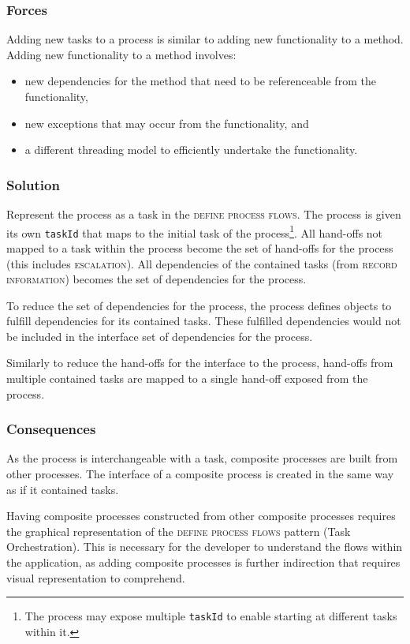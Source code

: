 \documentclass[prodmode]{style/acmlarge}
\begin{document}
\subsubsection*{Forces} Adding new tasks to a process is similar to adding new
functionality to a method.  Adding new functionality to a method involves:
\begin{itemize}
  \item new dependencies for the method that need to be referenceable from the functionality,
  \item new exceptions that may occur from the functionality, and
  \item a different threading model to efficiently undertake the functionality. 
\end{itemize}

\subsubsection*{Solution} Represent the process as a task in the \textsc{define
process flows}.  The process is given its own \texttt{taskId} that maps to the
initial task of the process\footnote{The process may expose multiple
\texttt{taskId} to enable starting at different tasks within it.}.  All
hand-offs not mapped to a task within the process become the set of hand-offs
for the process (this includes \textsc{escalation}).  All dependencies of the
contained tasks (from \textsc{record information}) becomes the set of
dependencies for the process.

To reduce the set of dependencies for the process, the process defines objects
to fulfill dependencies for its contained tasks.  These fulfilled dependencies
would not be included in the interface set of dependencies for the process.

Similarly to reduce the hand-offs for the interface to the process, hand-offs
from multiple contained tasks are mapped to a single hand-off exposed from the
process.

\subsubsection*{Consequences} As the process is interchangeable with a task,
composite processes are built from other processes.  The interface of a
composite process is created in the same way as if it contained tasks.

Having composite processes constructed from other composite processes requires
the graphical representation of the \textsc{define process flows} pattern (Task
Orchestration).  This is necessary for the developer to understand the flows
within the application, as adding composite processes is further indirection
that requires visual representation to comprehend.
\end{document}
